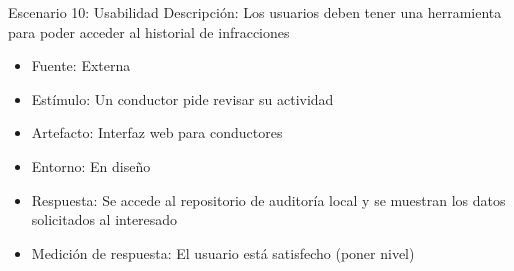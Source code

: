 Escenario 10: Usabilidad
Descripción: Los usuarios deben tener una herramienta para poder acceder al historial de infracciones 
\begin{itemize}
\item Fuente: Externa
\item Estímulo: Un conductor pide revisar su actividad
\item Artefacto: Interfaz web para conductores 
\item Entorno: En diseño 
\item Respuesta: Se accede al repositorio de auditoría local y se muestran los datos solicitados al interesado
\item Medición de respuesta: El usuario está satisfecho (poner nivel)
\end{itemize} 

